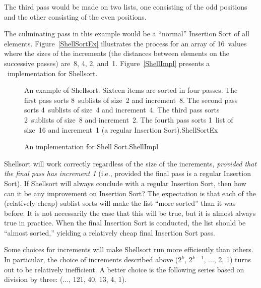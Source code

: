 The third pass would be made on two lists, one consisting of the odd
positions and the other consisting of the even positions.

The culminating pass in this example would be a ``normal'' Insertion
Sort of all elements.
Figure~\ref{ShellSortEx} illustrates the process for an array of
16~values where the sizes of the increments (the distances between
elements on the successive passes) are~8, 4, 2, and~1.
Figure~\ref{ShellImpl} presents a \Lang\ implementation for Shellsort.

\begin{figure}
\vspace{-1pt}

{An example of Shellsort.
Sixteen items are sorted in four passes.
The first pass sorts 8~sublists of size~2 and
increment~8.
The second pass sorts 4~sublists of size~4 and increment~4.
The third pass sorts 2~sublists of size~8 and increment~2.
The fourth pass sorts 1~list of size~16 and increment~1 (a regular
Insertion Sort).}{ShellSortEx}
\bigskip
\end{figure}

\begin{figure}
\vspace{-\bigskipamount}

{An implementation for Shell Sort.}{ShellImpl}
\end{figure}

Shellsort will work correctly regardless of the size of the
increments, \emph{provided that the final pass has increment 1}
(i.e., provided the final pass is a regular
Insertion Sort).
If Shellsort will always conclude with a regular Insertion Sort,
then how can it be any improvement on Insertion Sort?
The expectation is that each of the (relatively cheap) sublist sorts
will make the list ``more sorted'' than it was before.
It is not necessarily the case that this will be true, but it is
almost always true in practice.
When the final Insertion Sort is conducted, the list
should be ``almost sorted,'' yielding a relatively cheap final
Insertion Sort pass.

Some choices for increments will make Shellsort run more efficiently
than others.
In particular, the choice of increments described above (\(2^k\),
\(2^{k-1}\), ..., 2, 1) turns out to be relatively inefficient.
A better choice is the following series based on division by three:
(..., 121, 40, 13, 4, 1).

